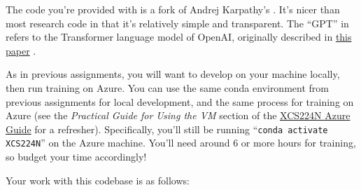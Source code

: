 
The code you're provided with is a fork of Andrej Karpathy's \href{https://github.com/karpathy/minGPT}{\mingpt}.
It's nicer than most research code in that it's relatively simple and transparent.
The ``GPT'' in \mingpt refers to the Transformer language model of OpenAI, originally described in \href{https://s3-us-west-2.amazonaws.com/openai-assets/research-covers/language-unsupervised/language_understanding_paper.pdf}{this paper} \cite{radford2018improving}.


As in previous assignments, you will want to develop on your machine locally, then run training on Azure. You can use the same conda environment from previous assignments for local development, and the same process for training on Azure (see the \textit{Practical Guide for Using the VM} section of the \href{https://docs.google.com/document/d/10J520Vnb1LnAMo0qgSYpG5cEEbomqQ371NIqg1IAv-4/edit?usp=sharing}{XCS224N Azure Guide} for a refresher). Specifically, you'll still be running ``\texttt{conda activate XCS224N}'' on the Azure machine. You'll need around 6 or more hours for training, so budget your time accordingly!

Your work with this codebase is as follows:

